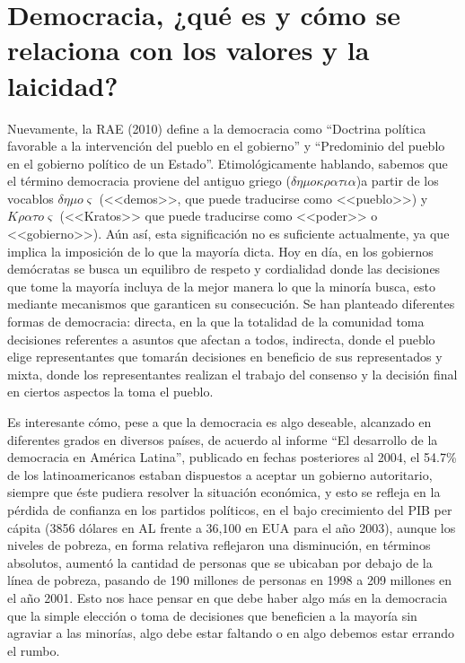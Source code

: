 \section{Democracia, ¿qué es y cómo se relaciona con los valores y la laicidad?}
Nuevamente, la RAE (2010) define a la democracia como “Doctrina política favorable a la intervención del pueblo en el gobierno” y “Predominio del pueblo en el gobierno político de un Estado”. Etimológicamente hablando, sabemos que el término democracia proviene del antiguo griego ($\delta\eta\mu o \kappa\rho\alpha\tau\iota\alpha$)a partir de los vocablos $\delta\eta\mu o\varsigma$ (<<demos>>, que puede traducirse como <<pueblo>>) y $K\rho\alpha\tau o\varsigma$ (<<Kratos>> que puede traducirse como <<poder>> o <<gobierno>>). Aún así, esta significación no es suficiente actualmente, ya que implica la imposición de lo que la mayoría dicta. Hoy en día, en los gobiernos demócratas se busca un equilibro de respeto y cordialidad donde las decisiones que tome la mayoría incluya de la mejor manera lo que la minoría busca, esto mediante mecanismos que garanticen su consecución. Se han planteado diferentes formas de democracia: directa, en la que la totalidad de la comunidad toma decisiones referentes a asuntos que afectan a todos, indirecta, donde el pueblo elige representantes que tomarán decisiones en beneficio de sus representados y mixta, donde los representantes realizan el trabajo del consenso y la decisión final en ciertos aspectos la toma el pueblo.

Es interesante cómo, pese a que la democracia es algo deseable, alcanzado en diferentes grados en diversos países, de acuerdo al informe “El desarrollo de la democracia en América Latina”, publicado en fechas posteriores al 2004, el 54.7\% de los latinoamericanos estaban dispuestos a aceptar un gobierno autoritario, siempre que éste pudiera resolver la situación económica, y esto se refleja en la pérdida de confianza en los partidos políticos, en el bajo crecimiento del PIB per cápita (3856 dólares en AL frente a 36,100 en EUA para el año 2003), aunque los niveles de pobreza, en forma relativa reflejaron una disminución, en términos absolutos, aumentó la cantidad de personas que se ubicaban por debajo de la línea de pobreza, pasando de 190 millones de personas en 1998 a 209 millones en el año 2001. Esto nos hace pensar en que debe haber algo más en la democracia que la simple elección o toma de decisiones que beneficien a la mayoría sin agraviar a las minorías, algo debe estar faltando o en algo debemos estar errando el rumbo.

